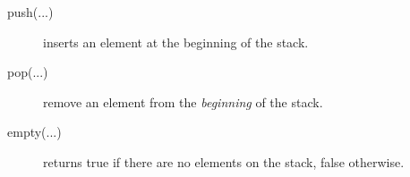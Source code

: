 \begin{description}
\item[push(...)] inserts an element at the beginning of the stack.
\item[pop(...) ] remove an element from the \emph{beginning} of the stack.
\item[empty(...) ] returns true if there are no elements on the stack,
  false otherwise.
\end{description}





